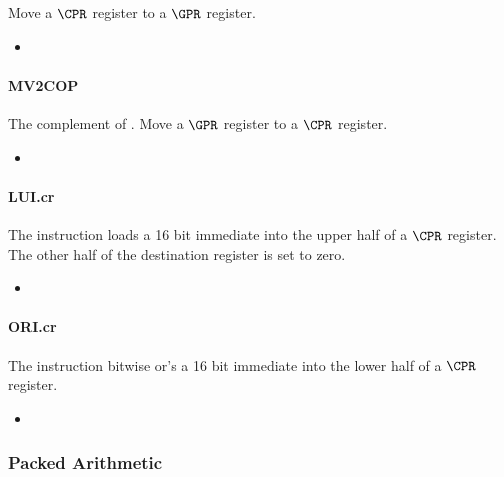 Move a $\CPR$ register to a $\GPR$ register.

\begin{itemize}
\item {}
\end{itemize}


\paragraph{MV2COP}

The complement of .
Move a $\GPR$ register to a $\CPR$ register.

\begin{itemize}
\item {}
\end{itemize}

\paragraph{LUI.cr}

The  instruction loads a 16 bit immediate into the
upper half of a $\CPR$ register. The other half of the
destination register is set to zero.

\begin{itemize}
\item {}
\end{itemize}

\paragraph{ORI.cr}

The  instruction bitwise or's a 16 bit immediate into the
lower half of a $\CPR$ register. 

\begin{itemize}
\item {}
\end{itemize}

\subsubsection{Packed Arithmetic}

